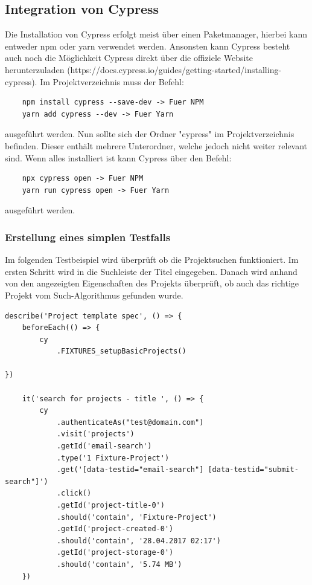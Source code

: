 \subsection{Integration von Cypress}
Die Installation von Cypress erfolgt meist über einen Paketmanager, hierbei kann entweder npm oder yarn verwendet werden. Ansonsten kann Cypress besteht auch noch die Möglichkeit Cypress direkt über die offiziele Website herunterzuladen (https://docs.cypress.io/guides/getting-started/installing-cypress).
Im Projektverzeichnis muss der Befehl:

\begin{lstlisting}
    npm install cypress --save-dev -> Fuer NPM
    yarn add cypress --dev -> Fuer Yarn
\end{lstlisting}

ausgeführt werden.
Nun sollte sich der Ordner "cypress" im Projektverzeichnis befinden. Dieser enthält mehrere Unterordner, welche jedoch nicht weiter relevant sind. Wenn alles installiert ist kann Cypress über den Befehl:

\begin{lstlisting}
    npx cypress open -> Fuer NPM
    yarn run cypress open -> Fuer Yarn
\end{lstlisting}

ausgeführt werden.
\cite{Integration_von_Cypress}

\subsubsection{Erstellung eines simplen Testfalls}
Im folgenden Testbeispiel wird überprüft ob die Projektsuchen funktioniert. Im ersten Schritt wird in die Suchleiste der Titel eingegeben. Danach wird anhand von den angezeigten Eigenschaften des Projekts überprüft, ob auch das richtige Projekt vom Such-Algorithmus gefunden wurde. 

\begin{lstlisting}
describe('Project template spec', () => {
    beforeEach(() => {
        cy
            .FIXTURES_setupBasicProjects()

})
    
    it('search for projects - title ', () => {
        cy
            .authenticateAs("test@domain.com")
            .visit('projects')
            .getId('email-search')
            .type('1 Fixture-Project')
            .get('[data-testid="email-search"] [data-testid="submit-search"]')
            .click()
            .getId('project-title-0')
            .should('contain', 'Fixture-Project')
            .getId('project-created-0')
            .should('contain', '28.04.2017 02:17')
            .getId('project-storage-0')
            .should('contain', '5.74 MB')
    })
\end{lstlisting}

